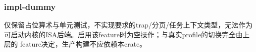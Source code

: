 
\subsubsection{impl-dummy}

仅保留占位算术与单元测试，不实现要求的trap/分页/任务上下文类型，无法作为可启动内核的ISA后端。启用该feature时为空操作；与真实profile的切换完全由上层的 feature决定，生产构建不应依赖本crate。

